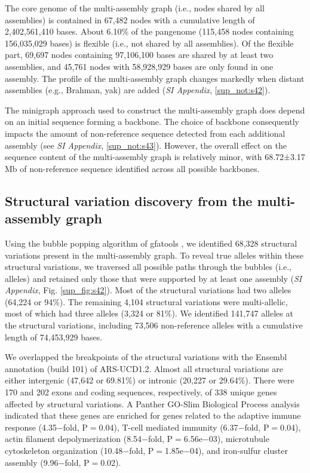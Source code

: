 \documentclass[../main.tex]{subfiles}
\begin{document}
The core genome of the multi-assembly graph (i.e., nodes shared by all assemblies) is contained in 67,482 nodes with a cumulative length of 2,402,561,410 bases. About 6.10\% of the pangenome (115,458 nodes containing 156,035,029 bases) is flexible (i.e., not shared by all assemblies). Of the flexible part, 69,697 nodes containing 97,106,100 bases are shared by at least two assemblies, and 45,761 nodes with 58,928,929 bases are only found in one assembly. The profile of the multi-assembly graph changes markedly when distant assemblies (e.g., Brahman, yak) are added (\emph{SI Appendix}, \ref{sup_not:s42}).

The minigraph approach used to construct the multi-assembly graph does depend on an initial sequence forming a backbone. The choice of backbone consequently impacts the amount of non-reference sequence detected from each additional assembly (see \emph{SI Appendix}, \ref{sup_not:s43}). However, the overall effect on the sequence content of the multi-assembly graph is relatively minor, with 68.72±3.17 Mb of non-reference sequence identified across all possible backbones.

\subsection*{Structural variation discovery from the multi-assembly graph}

Using the bubble popping algorithm of gfatools \citep{li2020design}, we identified 68,328 structural variations present in the multi-assembly graph. To reveal true alleles within these structural variations, we traversed all possible paths through the bubbles (i.e., alleles) and retained only those that were supported by at least one assembly (\emph{SI Appendix}, Fig. \ref{sup_fig:s42}). Most of the structural variations had two alleles (64,224 or 94\%). The remaining 4,104 structural variations were multi-allelic, most of which had three alleles (3,324 or 81\%). We identified 141,747 alleles at the structural variations, including 73,506 non-reference alleles with a cumulative length of 74,453,929 bases.  

We overlapped the breakpoints of the structural variations with the Ensembl annotation (build 101) of ARS-UCD1.2. Almost all structural variations are either intergenic (47,642 or 69.81\%) or intronic (20,227 or 29.64\%). There were 170 and 202 exons and coding sequences, respectively, of 338 unique genes affected by structural variations. A Panther GO-Slim Biological Process \citep{mi2019panther} analysis indicated that these genes are enriched for genes related to the adaptive immune response (4.35$-$fold, P$=$0.04), T-cell mediated immunity (6.37$-$fold, P$=$0.04), actin filament depolymerization (8.54$-$fold, P$=$6.56e$-$03), microtubule cytoskeleton organization (10.48$-$fold, P$=$1.85e$-$04), and iron-sulfur cluster assembly (9.96$-$fold, P$=$0.02). 
\end{document}
